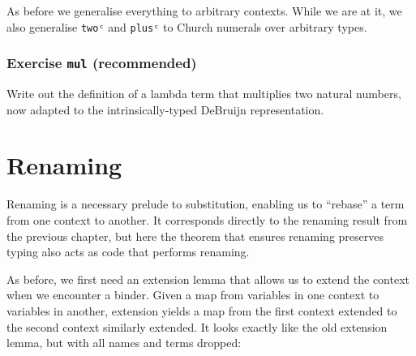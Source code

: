 As before we generalise everything to arbitrary contexts. While we are
at it, we also generalise \texttt{twoᶜ} and \texttt{plusᶜ} to Church
numerals over arbitrary types.

\hypertarget{exercise-mul-recommended}{%
\subsubsection{\texorpdfstring{Exercise \texttt{mul}
(recommended)}{Exercise mul (recommended)}}\label{exercise-mul-recommended}}

Write out the definition of a lambda term that multiplies two natural
numbers, now adapted to the intrinsically-typed DeBruijn representation.

\begin{fence}
\begin{code}%
\>[0]\<%
\end{code}
\end{fence}

\hypertarget{renaming}{%
\section{Renaming}\label{renaming}}

Renaming is a necessary prelude to substitution, enabling us to
``rebase'' a term from one context to another. It corresponds directly
to the renaming result from the previous chapter, but here the theorem
that ensures renaming preserves typing also acts as code that performs
renaming.

As before, we first need an extension lemma that allows us to extend the
context when we encounter a binder. Given a map from variables in one
context to variables in another, extension yields a map from the first
context extended to the second context similarly extended. It looks
exactly like the old extension lemma, but with all names and terms
dropped:

